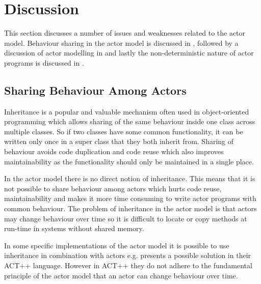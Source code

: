 \section{Discussion}\label{sec:actor_discussion}
This section discusses a number of issues and weaknesses related to the actor model. Behaviour sharing in the actor model is discussed in , followed by a discussion of actor modelling in  and lastly the non-deterministic nature of actor programs is discussed in .

\subsection{Sharing Behaviour Among Actors}\label{ssec:share_behaviour}
Inheritance is a popular and valuable mechanism often used in object-oriented programming which allows sharing of the same behaviour inside one class across multiple classes\cite{kafura1989inheritance}. So if two classes have some common functionality, it can be written only once in a super class that they both inherit from. Sharing of behaviour avoids code duplication and code reuse which also improves maintainability as the functionality should only be maintained in a single place.

In the actor model there is no direct notion of inheritance\cite{mackay1997has}. This means that it is not possible to share behaviour among actors which hurts code reuse, maintainability and makes it more time consuming to write actor programs with common behaviour. The problem of inheritance in the actor model is that actors may change behaviour over time so it is difficult to locate or copy methods at run-time in systems without shared memory\cite{kafura1989inheritance}.

In some specific implementations of the actor model it is possible to use inheritance in combination with actors e.g. \cite{kafura1989inheritance} presents a possible solution in their ACT++ language. However in ACT++ they do not adhere to the fundamental principle of the actor model that an actor can change behaviour over time. 

